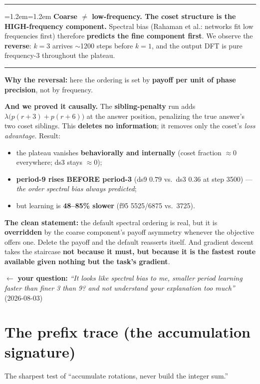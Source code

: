 \documentclass[11pt]{article}
\newcommand{\yourq}[2]{%
  \par\vspace{4pt}\noindent
  \textcolor{qcol}{$\leftarrow$ \textbf{your question:}
  \textit{``#1''}\; \textnormal{(#2)}}\par\vspace{4pt}}
\newenvironment{keybox}
  {\par\vspace{7pt}\noindent\hrule\vspace{5pt}%
   \begingroup\leftskip=1.2em\rightskip=1.2em\noindent\ignorespaces}
  {\par\endgroup\vspace{5pt}\hrule\vspace{7pt}}
\begin{document}
\begin{keybox}
\textbf{Coarse $\ne$ low-frequency. The coset structure is the HIGH-frequency
component.} Spectral bias (Rahaman et al.: networks fit low frequencies first)
therefore \textbf{predicts the fine component first}. We observe the
\textbf{reverse}: $k=3$ arrives $\sim$1200 steps before $k=1$, and the output DFT
is pure frequency-3 throughout the plateau.
\end{keybox}

\textbf{Why the reversal:} here the ordering is set by \textbf{payoff per unit of
phase precision}, not by frequency.

\textbf{And we proved it causally.} The \textbf{sibling-penalty} run adds
$\lambda\big(p(r{+}3) + p(r{+}6)\big)$ at the answer position, penalizing the true
answer's two coset siblings. This \textbf{deletes no information}; it removes only
the coset's \emph{loss advantage}. Result:

\begin{itemize}[leftmargin=*,itemsep=1pt]
\item the plateau vanishes \textbf{behaviorally and internally} (coset fraction
$\approx 0$ everywhere; ds3 stays $\approx 0$);
\item \textbf{period-9 rises BEFORE period-3} (ds9 $0.79$ vs.\ ds3 $0.36$ at step
3500) --- \emph{the order spectral bias always predicted};
\item but learning is \textbf{48--85\% slower} (f95 5525/6875 vs.\ 3725).
\end{itemize}

\textbf{The clean statement:} the default spectral ordering is real, but it is
\textbf{overridden} by the coarse component's payoff asymmetry whenever the
objective offers one. Delete the payoff and the default reasserts itself. And
gradient descent takes the staircase \textbf{not because it must, but because it
is the fastest route available given nothing but the task's gradient}.

\yourq{It looks like spectral bias to me, smaller period learning faster than
finer 3 than 9? and not understand your explanation too much}{2026-08-03}

\section{The prefix trace (the accumulation signature)}
\label{sec:prefix}

The sharpest test of ``accumulate rotations, never build the integer sum.''
\end{document}
